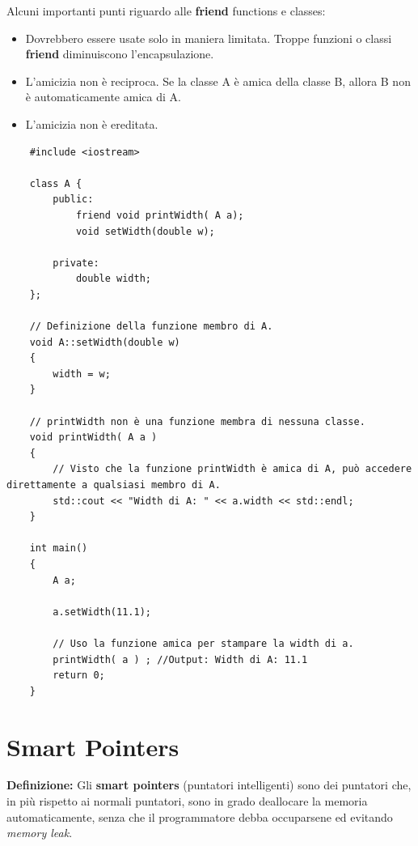 \textsf{\small Alcuni importanti punti riguardo alle \textbf{friend} functions e classes: } \\

\begin{itemize}
	\item \textsf{\small Dovrebbero essere usate solo in maniera limitata. Troppe funzioni o classi \textbf{friend} diminuiscono l'encapsulazione.}
	\item \textsf{\small L'amicizia non è reciproca. Se la classe A è amica della classe B, allora B non è automaticamente amica di A.}
	\item \textsf{\small L'amicizia non è ereditata.}
\end{itemize}

\begin{lstlisting}
	#include <iostream>
	
	class A {
		public:
			friend void printWidth( A a);
			void setWidth(double w);
			
		private:
			double width;
	};

	// Definizione della funzione membro di A.
	void A::setWidth(double w)
	{
		width = w;
	}

	// printWidth non è una funzione membra di nessuna classe.
	void printWidth( A a )
	{
		// Visto che la funzione printWidth è amica di A, può accedere direttamente a qualsiasi membro di A.
		std::cout << "Width di A: " << a.width << std::endl;
	}

	int main()
	{
		A a;
		
		a.setWidth(11.1);
		
		// Uso la funzione amica per stampare la width di a.
		printWidth( a ) ; //Output: Width di A: 11.1
		return 0;
	}
\end{lstlisting}


\newpage

\section{Smart Pointers}

\textsf{\small \textbf{Definizione: } Gli \textbf{smart pointers} (puntatori intelligenti) sono dei puntatori che, in più rispetto ai normali puntatori, sono in grado deallocare la memoria automaticamente, senza che il programmatore debba occuparsene ed evitando \emph{memory leak}.} \\

